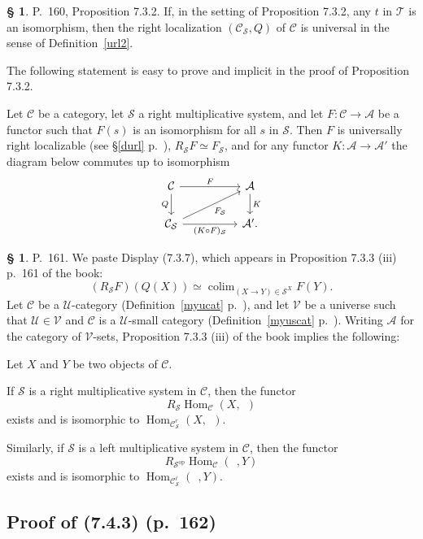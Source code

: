 \documentclass[12pt]{article}
\theoremstyle{remark}
\theoremstyle{definition}
\newtheorem{s}[thm]{\S}
\newcommand{\cc}{\mathcal}
\newcommand{\A}{\mathcal A}
\newcommand{\C}{\mathcal C}
\newcommand{\SSS}{\mathcal S}
\newcommand{\U}{\mathcal U}
\newcommand{\V}{\mathcal V}
\DeclareMathOperator*{\colim}{colim}
\DeclareMathOperator{\Hom}{Hom}
\DeclareMathOperator{\op}{op}
\begin{document}
\begin{s}\label{732} 
P.~160, Proposition 7.3.2. If, in the setting of Proposition 7.3.2, any $t$ in $\cc T$ is an isomorphism, then the right localization $(\C_{\cc S},Q)$ of $\C$ is universal in the sense of Definition~\ref{url2}.

The following statement is easy to prove and implicit in the proof of Proposition 7.3.2. 

Let $\C$ be a category, let $\SSS$ a right multiplicative system, and let $F:\C\to\A$ be a functor such that $F(s)$ is an isomorphism for all $s$ in $\SSS$. Then $F$ is universally right localizable (see \S\ref{durl} p.~\pageref{durl}), $R_{\SSS}F\simeq F_{\SSS}$, and for any functor $K:\A\to\A'$ the diagram below commutes up to isomorphism
$$
\begin{tikzcd}
\C\ar{rr}{F}\ar{d}[swap]{Q}&&\A\ar{d}{K}\\
\C_{\SSS}\ar{rr}[swap]{(K\circ F)_{\SSS}}\ar{rru}[swap]{F_{\SSS}}&&\A'.
\end{tikzcd}
$$
\end{s}

%

\begin{s}\label{737}
P.~161. We paste Display (7.3.7), which appears in Proposition 7.3.3 (iii) p.~161 of the book:
%
\begin{equation}\label{(7.3.7)}
(R_{\cc S}F)(Q(X))\simeq\colim_{(X\to Y)\in\cc S^X}F(Y).
\end{equation}
%
Let $\C$ be a $\U$-category (Definition~\ref{myucat} p.~\pageref{myucat}), and let $\V$ be a universe such that $\U\in\V$ and $\C$ is a $\U$-small category (Definition~\ref{myuscat} p.~\pageref{myuscat}). Writing $\A$ for the category of $\V$-sets, Proposition 7.3.3 (iii) of the book implies the following:

Let $X$ and $Y$ be two objects of $\C$. 

If $\cc S$ is a right multiplicative system in $\C$, then the functor 
$$
R_{\cc S}\Hom_\C(X,\ \ )
$$ 
exists and is isomorphic to $\Hom_{\C_{\cc S}^r}(X,\ \ )$. 

Similarly, if $\cc S$ is a left multiplicative system in $\C$, then the functor 
$$
R_{{\cc S}^{\op}}\Hom_\C(\ \ ,Y)
$$ 
exists and is isomorphic to $\Hom_{\C_{\cc S}^\ell}(\ \ ,Y)$.
% 
\end{s}


\subsection{Proof of (7.4.3) (p.~162)}
\end{document}

